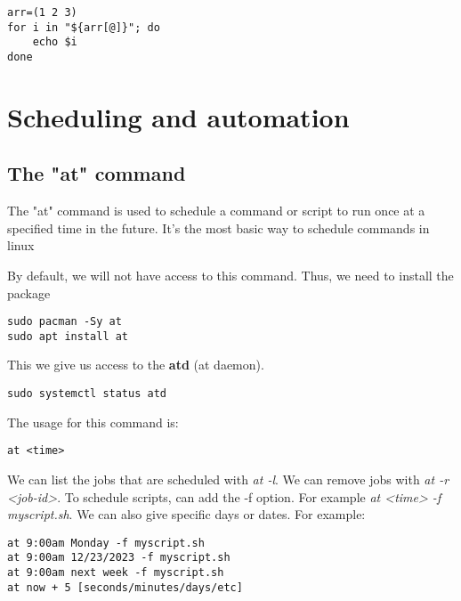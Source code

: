 \documentclass{report}
\begin{document}
    \begin{verbatim}
arr=(1 2 3)
for i in "${arr[@]}"; do
    echo $i
done
    \end{verbatim}
    \bigbreak \noindent
    

    \pagebreak \bigbreak \noindent 
    \section{\LARGE Scheduling and automation}
    \bigbreak \noindent 
    \subsection{The "at" command}
    \bigbreak \noindent 
    \begin{concept}
        The "at" command is used to schedule a command or script to run once at a specified time in the future. It's the most basic way to schedule commands in linux
    \end{concept}
    \bigbreak \noindent 
    By default, we will not have access to this command. Thus, we need to install the package
    \bigbreak \noindent 
    \begin{verbatim}
sudo pacman -Sy at
sudo apt install at
    \end{verbatim}
    \bigbreak \noindent 
    This we give us access to the \textbf{atd} (at daemon).
    \bigbreak \noindent 
    \begin{verbatim}
sudo systemctl status atd  
    \end{verbatim}
    \bigbreak \noindent 
    The usage for this command is:
    
    \begin{verbatim}
at <time>
    \end{verbatim}
    \bigbreak \noindent
    
    \bigbreak \noindent 
    We can list the jobs that are scheduled with \textit{at -l}. We can remove jobs with \textit{at -r <job-id>}. To schedule scripts, can add the -f option. For example \textit{at <time> -f myscript.sh}. 
    \bigbreak \noindent 
    We can also give specific days or dates. For example:
    \begin{verbatim}
at 9:00am Monday -f myscript.sh
at 9:00am 12/23/2023 -f myscript.sh
at 9:00am next week -f myscript.sh
at now + 5 [seconds/minutes/days/etc]
    \end{verbatim}
    \bigbreak \noindent
    
    \pagebreak \bigbreak \noindent 
\end{document}
